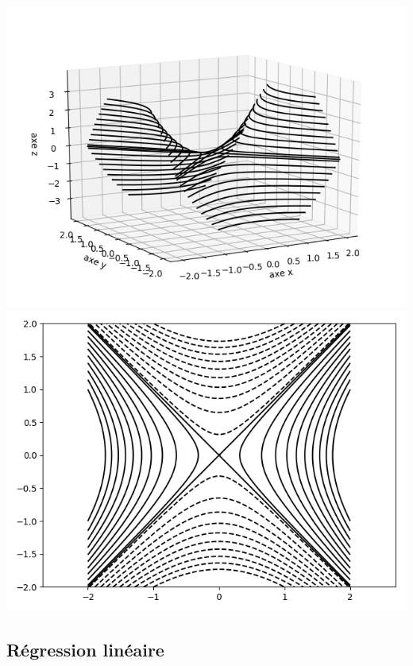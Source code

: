 \begin{exemple}{}{}
\begin{center}
		\includegraphics[scale=\myscale,scale=0.5]{figures/fonctions-quadra-3d}
		\includegraphics[scale=\myscale,scale=0.5]{figures/fonctions-quadra-3e}
	\end{center}
	
\end{exemple}


\subsection{Régression linéaire}


